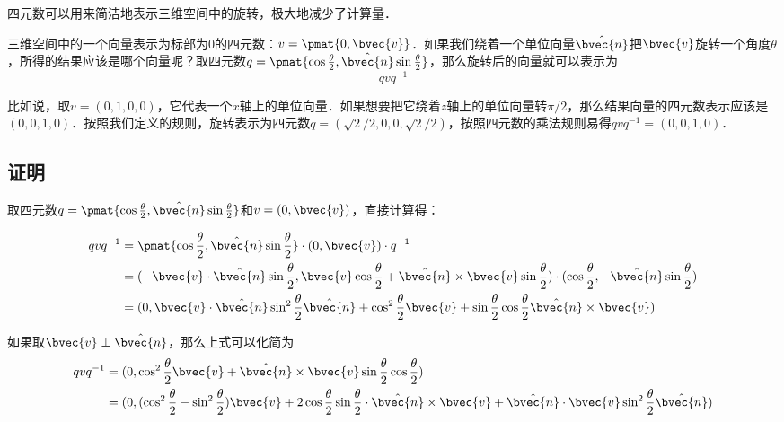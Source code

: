 
\begin{issues}
\issueAbstract
\issueTODO
\end{issues}


四元数可以用来简洁地表示三维空间中的旋转，极大地减少了计算量．

三维空间中的一个向量表示为标部为$0$的四元数：$v=\pmat{0, \bvec{v}}$．如果我们绕着一个单位向量$\hat{\bvec{n}}$把$\bvec{v}$旋转一个角度$\theta$，所得的结果应该是哪个向量呢？取四元数$q=\pmat{\cos{\frac{\theta}{2}}, \hat{\bvec{n}}\sin{\frac{\theta}{2}}}$，那么旋转后的向量就可以表示为
\begin{equation}
qvq^{-1}
\end{equation}

比如说，取$v=(0, 1, 0, 0)$，它代表一个$x$轴上的单位向量．如果想要把它绕着$z$轴上的单位向量转$\pi/2$，那么结果向量的四元数表示应该是$(0, 0, 1, 0)$．按照我们定义的规则，旋转表示为四元数$q=(\sqrt{2}/2, 0, 0, \sqrt{2}/2)$，按照四元数的乘法规则易得$qvq^{-1}=(0,0,1,0)$．

\subsection{证明}

取四元数$q=\pmat{\cos{\frac{\theta}{2}}, \hat{\bvec{n}}\sin{\frac{\theta}{2}}}$和$v=(0, \bvec{v})$，直接计算得：

\begin{equation}
\begin{aligned}
qvq^{-1}&=\pmat{\cos{\frac{\theta}{2}}, \hat{\bvec{n}}\sin{\frac{\theta}{2}}}\cdot (0, \bvec{v})\cdot q^{-1}\\&
=(-\bvec{v}\cdot\hat{\bvec{n}}\sin{\frac{\theta}{2}}, \bvec{v}\cos{\frac{\theta}{2}}+\hat{\bvec{n}}\times\bvec{v}\sin{\frac{\theta}{2}})\cdot (\cos{\frac{\theta}{2}}, -\hat{\bvec{n}}\sin{\frac{\theta}{2}})\\&
=(0, \bvec{v}\cdot\hat{\bvec{n}}\sin^2{\frac{\theta}{2}}\hat{\bvec{n}}+\cos^2{\frac{\theta}{2}}\bvec{v}+\sin{\frac{\theta}{2}}\cos{\frac{\theta}{2}}\hat{\bvec{n}}\times\bvec{v})
\end{aligned}
\end{equation}

如果取$\bvec{v}\perp\hat{\bvec{n}}$，那么上式可以化简为
\begin{equation}
\begin{aligned}
qvq^{-1}&=(0, \cos^2{\frac{\theta}{2}}\bvec{v}+\hat{\bvec{n}}\times\bvec{v}\sin{\frac{\theta}{2}}\cos{\frac{\theta}{2}})\\&
=(0, (\cos^2\frac{\theta}{2}-\sin^2\frac{\theta}{2})\bvec{v}+2\cos\frac{\theta}{2}\sin\frac{\theta}{2}\cdot \hat{\bvec{n}}\times\bvec{v}+\hat{\bvec{n}}\cdot\bvec{v}\sin^2\frac{\theta}{2}\hat{\bvec{n}})
\end{aligned}
\end{equation}





